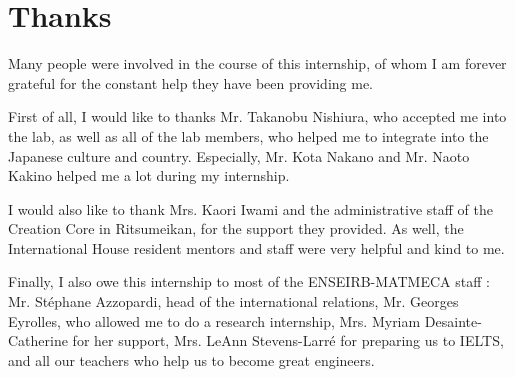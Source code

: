 \chapter*{Thanks}
Many people were involved in the course of this internship, of whom I am forever grateful for the constant help they have been providing me.

First of all, I would like to thanks Mr. Takanobu Nishiura, who accepted me into the lab, as well as all of the lab members, who helped me to integrate into the Japanese culture and country. Especially, Mr. Kota Nakano and Mr. Naoto Kakino helped me a lot during my internship.

I would also like to thank Mrs. Kaori Iwami and the administrative staff of the Creation Core in Ritsumeikan, for the support they provided. As well, the International House resident mentors and staff were very helpful and kind to me.

Finally, I also owe this internship to most of the ENSEIRB-MATMECA staff : Mr. Stéphane Azzopardi, head of the international relations, Mr. Georges Eyrolles, who allowed me to do a research internship, Mrs. Myriam Desainte-Catherine for her support, Mrs. LeAnn Stevens-Larré for preparing us to IELTS,  and all our teachers who help us to become great engineers.